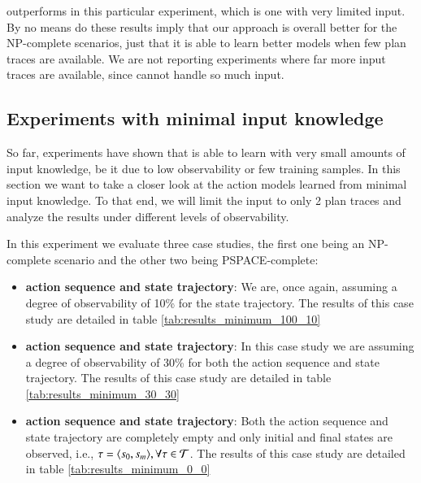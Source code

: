 
\FAMA outperforms \ARMS in this particular experiment, which is one with very limited input. By no means do these results imply that our approach is overall better for the NP-complete scenarios, just that it is able to learn better models when few plan traces are available. We are not reporting experiments where far more input traces are available, since \FAMA cannot handle so much input.



\subsection{Experiments with minimal input knowledge}
\label{minimal}
So far, experiments have shown that \FAMA is able to learn with very small amounts of input knowledge, be it due to low observability or few training samples. In this section we want to take a closer look at the action models learned from minimal input knowledge. To that end, we will limit the input to only 2 plan traces and analyze the results under different levels of observability.

In this experiment we evaluate three case studies, the first one being an NP-complete scenario and the other two being PSPACE-complete:
\begin{itemize}
	\item \textbf{\FO action sequence and \PO state trajectory}: We are, once again, assuming a degree of observability of 10\% for the state trajectory. The results of this case study are detailed in table \ref{tab:results_minimum_100_10}
	\item  \textbf{\PO action sequence and \PO state trajectory}: In this case study we are assuming a degree of observability of 30\% for both the action sequence and state trajectory. The results of this case study are detailed in table \ref{tab:results_minimum_30_30}
	\item  \textbf{\NO action sequence and \NO state trajectory}: Both the action sequence and state trajectory are completely empty and only initial and final states are observed, i.e., $\tau = {\langle s_0, s_m \rangle}, \forall \tau \in \mathcal{T}$. The results of this case study are detailed in table \ref{tab:results_minimum_0_0}
\end{itemize}

